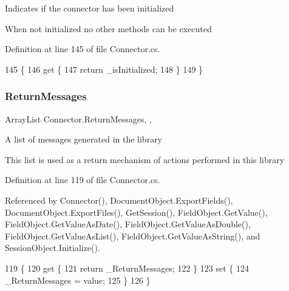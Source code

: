 Indicates if the connector has been initialized 

When not initialized no other methods can be executed

Definition at line 145 of file Connector.\+cs.


\begin{DoxyCode}
145                               \{
146         \textcolor{keyword}{get} \{
147             \textcolor{keywordflow}{return} \_isInitialized;
148         \}
149     \}
\end{DoxyCode}
\mbox{\label{class_connector_a1ed422674b344524fd77998dcf6a9ba6}} 
\subsubsection{\texorpdfstring{Return\+Messages}{ReturnMessages}}
{\footnotesize\ttfamily Array\+List Connector.\+Return\+Messages\hspace{0.3cm}{\ttfamily [static]}, {\ttfamily [get]}, {\ttfamily [set]}}



A list of messages generated in the library 

This list is used as a return mechanism of actions performed in this library

Definition at line 119 of file Connector.\+cs.



Referenced by Connector(), Document\+Object.\+Export\+Fields(), Document\+Object.\+Export\+Files(), Get\+Session(), Field\+Object.\+Get\+Value(), Field\+Object.\+Get\+Value\+As\+Date(), Field\+Object.\+Get\+Value\+As\+Double(), Field\+Object.\+Get\+Value\+As\+List(), Field\+Object.\+Get\+Value\+As\+String(), and Session\+Object.\+Initialize().


\begin{DoxyCode}
119                                            \{
120         \textcolor{keyword}{get} \{
121             \textcolor{keywordflow}{return} \_ReturnMessages;
122         \}
123         \textcolor{keyword}{set} \{
124             \_ReturnMessages = value;
125         \}
126     \}
\end{DoxyCode}
\mbox{\label{class_connector_a0a7bb42f9530796c086ab50785147ce9}} 
